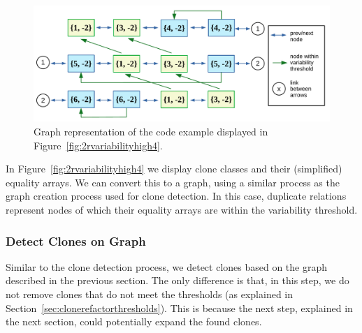 \begin{figure}[H]
  \centering
  \includegraphics[width=1\columnwidth]{img/T2RGraph}
  \caption{Graph representation of the code example displayed in Figure~\ref{fig:2rvariabilityhigh4}.}
  \label{fig:t2rgraphexample}
\end{figure}

In Figure~\ref{fig:2rvariabilityhigh4} we display clone classes and their (simplified) equality arrays. We can convert this to a graph, using a similar process as the graph creation process used for clone detection. In this case, duplicate relations represent nodes of which their equality arrays are within the variability threshold. %


\subsubsection{Detect Clones on Graph}
Similar to the clone detection process, we detect clones based on the graph described in the previous section. The only difference is that, in this step, we do not remove clones that do not meet the thresholds (as explained in Section~\ref{sec:clonerefactorthresholds}). This is because the next step, explained in the next section, could potentially expand the found clones.

